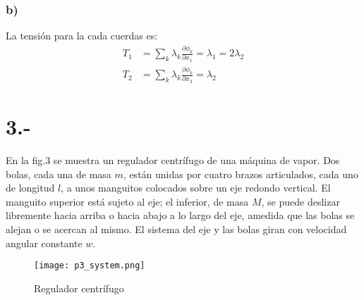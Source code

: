 \documentclass{article}
\begin{document}
\begin{tcolorbox}[breakable]
    \subsubsection*{b)}
    La tensión para la cada cuerdas es:
    \begin{align*}
        T_1 &= \sum_k \lambda_k \frac{\partial \phi_k}{\partial x_1} = \lambda_1 = 2\lambda_2 \\
        T_2 &= \sum_k \lambda_k \frac{\partial \phi_k}{\partial x_2} = \lambda_2
    \end{align*}

\end{tcolorbox}
\newpage
\section*{3.-}
En la fig.3 se muestra un regulador centrífugo de una máquina de vapor. Dos bolas, cada una de masa $m$, están unidas por cuatro brazos articulados, 
cada uno de longitud $l$, a unos manguitos colocados sobre un eje redondo vertical. El manguito superior está sujeto al eje; el inferior, de masa $M$, 
se puede deslizar libremente hacia arriba o hacia abajo a lo largo del eje, amedida que las bolas se alejan o se acercan al mismo. 
El sistema del eje y las bolas giran con velocidad angular constante $w$.
\begin{figure}[H]
    \centering
    \texttt{[image: p3\_system.png]}
    \caption{Regulador centrífugo}
\end{figure}
\end{document}
